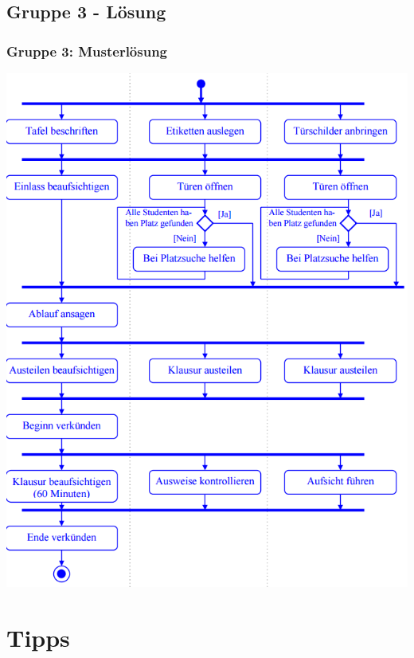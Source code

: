 \documentclass[18pt]{beamer}
\begin{document}
	\subsection{Gruppe 3 - Lösung }
	\begin{frame}
	\frametitle{Gruppe 3: Musterlösung}
	\centering
	\includegraphics[scale=0.35]{./pics/tut2/group3sol.png}
	\end{frame}


\section{Tipps}
\end{document}
